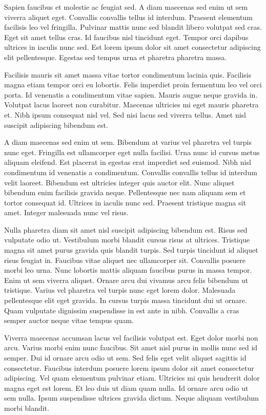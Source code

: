 \documentclass[11pt,a4paper]{article}
\begin{document}
Sapien faucibus et molestie ac feugiat sed. A diam maecenas sed enim ut sem viverra aliquet eget. Convallis convallis tellus id interdum. Praesent elementum facilisis leo vel fringilla. Pulvinar mattis nunc sed blandit libero volutpat sed cras. Eget sit amet tellus cras. Id faucibus nisl tincidunt eget. Tempor orci dapibus ultrices in iaculis nunc sed. Est lorem ipsum dolor sit amet consectetur adipiscing elit pellentesque. Egestas sed tempus urna et pharetra pharetra massa.

Facilisis mauris sit amet massa vitae tortor condimentum lacinia quis. Facilisis magna etiam tempor orci eu lobortis. Felis imperdiet proin fermentum leo vel orci porta. Id venenatis a condimentum vitae sapien. Mauris augue neque gravida in. Volutpat lacus laoreet non curabitur. Maecenas ultricies mi eget mauris pharetra et. Nibh ipsum consequat nisl vel. Sed nisi lacus sed viverra tellus. Amet nisl suscipit adipiscing bibendum est.

A diam maecenas sed enim ut sem. Bibendum at varius vel pharetra vel turpis nunc eget. Fringilla est ullamcorper eget nulla facilisi. Urna nunc id cursus metus aliquam eleifend. Est placerat in egestas erat imperdiet sed euismod. Nibh nisl condimentum id venenatis a condimentum. Convallis convallis tellus id interdum velit laoreet. Bibendum est ultricies integer quis auctor elit. Nunc aliquet bibendum enim facilisis gravida neque. Pellentesque nec nam aliquam sem et tortor consequat id. Ultrices in iaculis nunc sed. Praesent tristique magna sit amet. Integer malesuada nunc vel risus.

Nulla pharetra diam sit amet nisl suscipit adipiscing bibendum est. Risus sed vulputate odio ut. Vestibulum morbi blandit cursus risus at ultrices. Tristique magna sit amet purus gravida quis blandit turpis. Sed turpis tincidunt id aliquet risus feugiat in. Faucibus vitae aliquet nec ullamcorper sit. Convallis posuere morbi leo urna. Nunc lobortis mattis aliquam faucibus purus in massa tempor. Enim ut sem viverra aliquet. Ornare arcu dui vivamus arcu felis bibendum ut tristique. Varius vel pharetra vel turpis nunc eget lorem dolor. Malesuada pellentesque elit eget gravida. In cursus turpis massa tincidunt dui ut ornare. Quam vulputate dignissim suspendisse in est ante in nibh. Convallis a cras semper auctor neque vitae tempus quam.

Viverra maecenas accumsan lacus vel facilisis volutpat est. Eget dolor morbi non arcu. Varius morbi enim nunc faucibus. Sit amet nisl purus in mollis nunc sed id semper. Dui id ornare arcu odio ut sem. Sed felis eget velit aliquet sagittis id consectetur. Faucibus interdum posuere lorem ipsum dolor sit amet consectetur adipiscing. Vel quam elementum pulvinar etiam. Ultricies mi quis hendrerit dolor magna eget est lorem. Et leo duis ut diam quam nulla. Id ornare arcu odio ut sem nulla. Ipsum suspendisse ultrices gravida dictum. Neque aliquam vestibulum morbi blandit.
\end{document}
